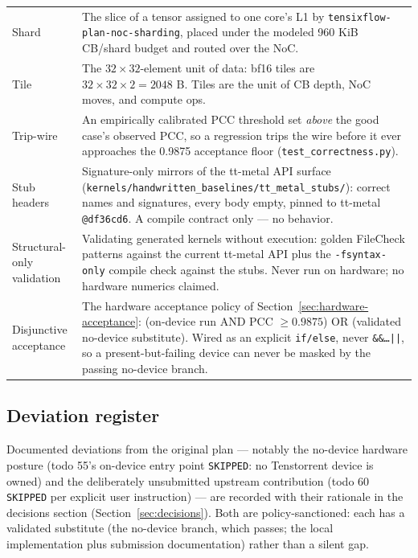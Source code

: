\begin{longtable}{@{}p{3.4cm}p{11.3cm}@{}}
  Shard & The slice of a tensor assigned to one core's L1 by \texttt{tensixflow-plan-noc-sharding}, placed under the modeled 960 KiB CB/shard budget and routed over the NoC. \\
  Tile & The $32\times32$-element unit of data: bf16 tiles are $32\times32\times2 = 2048$ B. Tiles are the unit of CB depth, NoC moves, and compute ops. \\
  Trip-wire & An empirically calibrated PCC threshold set \emph{above} the good case's observed PCC, so a regression trips the wire before it ever approaches the 0.9875 acceptance floor (\texttt{test\_correctness.py}). \\
  Stub headers & Signature-only mirrors of the tt-metal API surface (\texttt{kernels/handwritten\_baselines/tt\_metal\_stubs/}): correct names and signatures, every body empty, pinned to tt-metal \texttt{@df36cd6}. A compile contract only --- no behavior. \\
  Structural-only validation & Validating generated kernels without execution: golden FileCheck patterns against the current tt-metal API plus the \texttt{-fsyntax-only} compile check against the stubs. Never run on hardware; no hardware numerics claimed. \\
  Disjunctive acceptance & The hardware acceptance policy of Section~\ref{sec:hardware-acceptance}: (on-device run AND PCC $\ge 0.9875$) OR (validated no-device substitute). Wired as an explicit \texttt{if/else}, never \texttt{\&\&\ldots||}, so a present-but-failing device can never be masked by the passing no-device branch. \\
\end{longtable}

\subsection{Deviation register}

Documented deviations from the original plan --- notably the no-device
hardware posture (todo 55's on-device entry point \texttt{SKIPPED}: no
Tenstorrent device is owned) and the deliberately unsubmitted upstream
contribution (todo 60 \texttt{SKIPPED} per explicit user instruction) ---
are recorded with their rationale in the decisions section
(Section~\ref{sec:decisions}). Both are policy-sanctioned: each has a
validated substitute (the no-device branch, which passes; the local
implementation plus submission documentation) rather than a silent gap.
